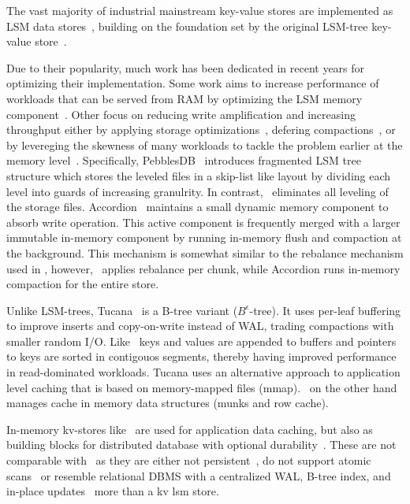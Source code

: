 

The vast majority of industrial mainstream key-value stores are  implemented as LSM data
stores~\cite{Bigtable2008,hbase,cassandra2010,RocksDB, scylladb}, building on the foundation set by the original LSM-tree key-value store~\cite{O'Neil1996, Muth1998}.

Due to their popularity, much work has been dedicated in recent years for optimizing their implementation. Some work aims to increase performance of workloads that can be served from 
RAM by optimizing the LSM memory component~\cite{clsm2015, accordion}. Other focus on reducing write amplification and increasing throughput either by applying storage optimizations~\cite{WiscKey, PebblesDB}, defering compactions~\cite{PebblesDB, triad}, or by levereging the skewness of many workloads to tackle the problem earlier at the memory level~\cite{ accordion, triad}.
Specifically, PebblesDB~\cite{PebblesDB} introduces fragmented LSM tree structure which stores the leveled files in a skip-list like layout by dividing each level into guards of increasing granulrity. In contrast, \sys\ eliminates all leveling of the storage files. 
Accordion~\cite{accordion} maintains a small dynamic memory component to absorb write operation. This active component is frequently merged with a larger immutable in-memory component by running in-memory flush and compaction at the background. This mechanism is somewhat similar to the rebalance mechanism used in \sys, however, \sys\ applies rebalance per chunk, while Accordion runs in-memory compaction for the entire store.

Unlike LSM-trees, Tucana~\cite{tucana} is a B-tree variant ($B^{\epsilon}$-tree). It uses per-leaf buffering to improve inserts and copy-on-write instead of WAL, trading compactions with smaller random I/O. 
Like \sys\ keys and values are appended to buffers and pointers to keys are sorted in contigouos segments, thereby having improved performance in read-dominated workloads.
Tucana uses an alternative approach to application level caching that is based on memory-mapped files (mmap). \sys\ on the other hand manages cache in memory data structures (munks and row cache).


In-memory kv-stores like~\cite{memcached, ignite, redis} are used for application data caching, but also as building blocks for distributed database with optional durability~\cite{ignite,redis}. These are not comparable with \sys\ as they are either not persistent~\cite{memcached}, do not support atomic scans~\cite{redis} or resemble  relational DBMS with a centralized WAL, B-tree index, and in-place updates~\cite{ignite}  more than a kv lsm store.
